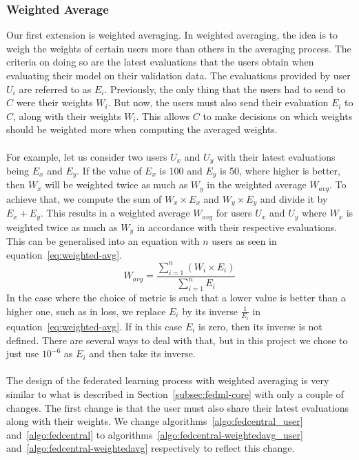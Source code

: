 \documentclass[12pt]{article}
\begin{document}
\subsubsection{Weighted Average}\label{subsubsec:weighted-avg}
Our first extension is weighted averaging. In weighted averaging, the idea is to weigh the weights of certain users more than others in the averaging process. The criteria on doing so are the latest evaluations that the users obtain when evaluating their model on their validation data. The evaluations provided by user $U_i$ are referred to as $E_i$. Previously, the only thing that the users had to send to $C$ were their weights $W_i$. But now, the users must also send their evaluation $E_i$ to $C$, along with their weights $W_i$. This allows $C$ to make decisions on which weights should be weighted more when computing the averaged weights.
\\\\
For example, let us consider two users $U_x$ and $U_y$ with their latest evaluations being $E_x$ and $E_y$. If the value of $E_x$ is 100 and $E_y$ is 50, where higher is better, then $W_x$ will be weighted twice as much as $W_y$ in the weighted average $W_{avg}$. To achieve that, we compute the sum of $W_x \times E_x$ and $W_y \times E_y$ and divide it by $E_x + E_y$. This results in a weighted average $W_{avg}$ for users $U_x$ and $U_y$ where $W_x$ is weighted twice as much as $W_y$ in accordance with their respective evaluations. This can be generalised into an equation with $n$ users as seen in equation~\ref{eq:weighted-avg}.
\begin{equation}\label{eq:weighted-avg}
	W_{avg} = \frac{\sum_{i=1}^{n} \left({W_i \times E_i}\right)}{\sum_{i=1}^{n} {E_i}}
\end{equation}
In the case where the choice of metric is such that a lower value is better than a higher one, such as in loss, we replace $E_i$ by its inverse $\frac{1}{E_i}$ in equation~\ref{eq:weighted-avg}. If in this case $E_i$ is zero, then its inverse is not defined. There are several ways to deal with that, but in this project we chose to just use $10^{-6}$ as $E_i$ and then take its inverse. 
\\\\
The design of the federated learning process with weighted averaging is very similar to what is described in Section~\ref{subsec:fedml-core} with only a couple of changes. The first change is that the user must also share their latest evaluations along with their weights. We change algorithms~\ref{algo:fedcentral_user} and~\ref{algo:fedcentral} to algorithms~\ref{algo:fedcentral-weightedavg_user} and~\ref{algo:fedcentral-weightedavg} respectively to reflect this change.
\end{document}
